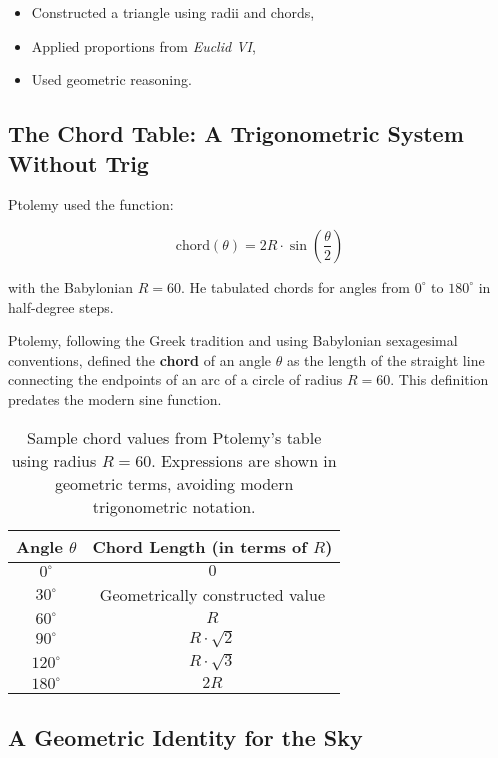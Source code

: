 \begin{itemize}
    \item Constructed a triangle using radii and chords,
    \item Applied proportions from \textit{Euclid VI},
    \item Used geometric reasoning.
\end{itemize}

\subsection{The Chord Table: A Trigonometric System Without Trig}

Ptolemy used the function:

\[
\text{chord}(\theta) = 2R \cdot \sin\left(\frac{\theta}{2}\right)
\]

with the Babylonian \( R = 60 \). He tabulated chords for angles from \( 0^\circ \) to \( 180^\circ \) in half-degree steps.

Ptolemy, following the Greek tradition and using Babylonian sexagesimal conventions, defined the \textbf{chord} of an angle \( \theta \) as the length of the straight line connecting the endpoints of an arc of a circle of radius \( R = 60 \). This definition predates the modern sine function.

\begin{table}[H]
\centering
\renewcommand{\arraystretch}{1.4}
\begin{tabular}{|c|c|}
\hline
\textbf{Angle \( \theta \)} & \textbf{Chord Length (in terms of \( R \))} \\
\hline
\( 0^\circ \) & \( 0 \) \\
\( 30^\circ \) & Geometrically constructed value \\
\( 60^\circ \) & \( R \) \\
\( 90^\circ \) & \( R \cdot \sqrt{2} \) \\
\( 120^\circ \) & \( R \cdot \sqrt{3} \) \\
\( 180^\circ \) & \( 2R \) \\
\hline
\end{tabular}
\caption{Sample chord values from Ptolemy’s table using radius \( R = 60 \). Expressions are shown in geometric terms, avoiding modern trigonometric notation.}
\end{table}


\subsection{A Geometric Identity for the Sky}

